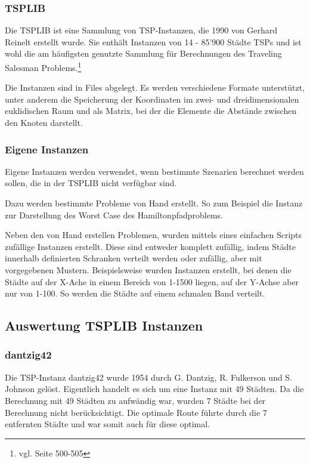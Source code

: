 \documentclass[11pt,a4paper]{article}
\begin{document}
\subsubsection{TSPLIB}
Die TSPLIB ist eine Sammlung von TSP-Instanzen, die 1990 von Gerhard Reinelt erstellt wurde. Sie enthält Instanzen von 14 - 85'900 Städte TSPs und ist wohl die am häufigsten genutzte Sammlung für Berechnungen des Traveling Salesman Problems.\footnote{vgl. \cite{applegate06} Seite 500-505}

Die Instanzen sind in Files abgelegt. Es werden verschiedene Formate unterstützt, unter anderem die Speicherung der Koordinaten im zwei- und dreidimensionalen euklidischen Raum und als Matrix, bei der die Elemente die Abstände zwischen den Knoten darstellt.

\subsubsection{Eigene Instanzen}
Eigene Instanzen werden verwendet, wenn bestimmte Szenarien berechnet werden sollen, die in der TSPLIB nicht verfügbar sind.

Dazu werden bestimmte Probleme von Hand erstellt. So zum Beispiel die Instanz zur Darstellung des Worst Case des Hamiltonpfadproblems.

Neben den von Hand erstellen Problemen, wurden mittels eines einfachen Scripts zufällige Instanzen erstellt. Diese sind entweder komplett zufällig, indem Städte innerhalb definierten Schranken verteilt werden oder zufällig, aber mit vorgegebenen Mustern. Beispielsweise wurden Instanzen erstellt, bei denen die Städte auf der X-Ache in einem Bereich von 1-1500 liegen, auf der Y-Achse aber nur von 1-100. So werden die Städte auf einem schmalen Band verteilt.

\subsection{Auswertung TSPLIB Instanzen}

\subsubsection{dantzig42}
Die TSP-Instanz dantzig42 wurde 1954 durch G. Dantzig, R. Fulkerson und S. Johnson gelöst. Eigentlich handelt es sich um eine Instanz mit 49 Städten. Da die Berechnung mit 49 Städten zu aufwändig war, wurden 7 Städte bei der Berechnung nicht berücksichtigt. Die optimale Route führte durch die 7 entfernten Städte und war somit auch für diese optimal.
\end{document}
